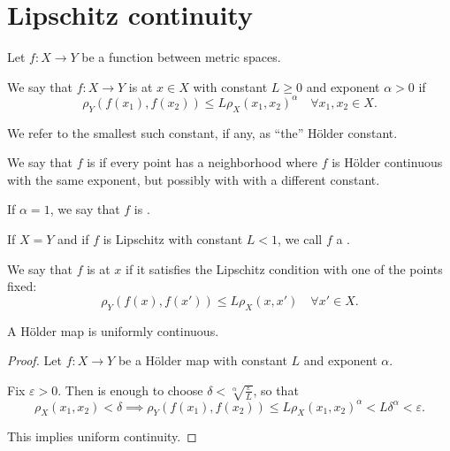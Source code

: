 \section{Lipschitz continuity}\label{sec:lipschitz_continuity}

\begin{definition}\label{def:lipschitz_continuity}
  Let \( f: X \to Y \) be a function between metric spaces.

  \begin{thmenum}
     We say that \( f: X \to Y \) is  at \( x \in X \) with constant \( L \geq 0 \) and exponent \( \alpha > 0 \) if
    \begin{equation*}
      \rho_Y(f(x_1), f(x_2)) \leq L \rho_X(x_1, x_2)^\alpha \quad\forall x_1, x_2 \in X.
    \end{equation*}

    We refer to the smallest such constant, if any, as \enquote{the} H\"older constant.

     We say that \( f \) is  if every point has a neighborhood where \( f \) is H\"older continuous with the same exponent, but possibly with with a different constant.

     If \( \alpha = 1 \), we say that \( f \) is .

     If \( X = Y \) and if \( f \) is Lipschitz with constant \( L < 1 \), we call \( f \) a .

     We say that \( f \) is  at \( x \) if it satisfies the Lipschitz condition with one of the points fixed:
    \begin{equation*}
      \rho_Y(f(x), f(x')) \leq L \rho_X(x, x') \quad\forall x' \in X.
    \end{equation*}
  \end{thmenum}
\end{definition}

\begin{proposition}\label{thm:holder_map_is_uniformly_continuous}
  A H\"older map is uniformly continuous.
\end{proposition}
\begin{proof}
  Let \( f: X \to Y \) be a H\"older map with constant \( L \) and exponent \( \alpha \).

  Fix \( \varepsilon > 0 \). Then is enough to choose \( \delta < \sqrt[\alpha]{\frac \varepsilon L} \), so that
  \begin{equation*}
    \rho_X(x_1, x_2) < \delta \implies \rho_Y(f(x_1), f(x_2)) \leq L \rho_X(x_1, x_2)^\alpha < L \delta^\alpha < \varepsilon.
  \end{equation*}

  This implies uniform continuity.
\end{proof}

